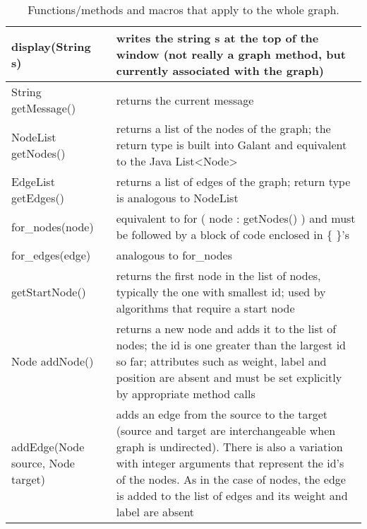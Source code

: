 \begin{table}
  \centering
  \begin{tabular}{| l | p{} |}
    \hline
    \textsf{display(String s)}
    &
    writes the string \textsf{s} at the top of the window
    (not really a graph method, but currently associated with the graph)
    \\ \hline
    \textsf{String getMessage()}
    &
    returns the current message
    \\ \hline
    \textsf{NodeList getNodes()}
    &
    returns a list of the nodes of the graph; the return type is built into Galant
    and equivalent to the Java \textsf{List<Node>}
    \\ \hline
    \textsf{EdgeList getEdges()}
    &
    returns a list of edges of the graph; return type is analogous to \textsf{NodeList}
    \\ \hline
    \textsf{for\_nodes(node)}
    &
    equivalent to \textsf{for ( node : getNodes() )} and must be followed by a block
    of code enclosed in \textsf{\{ \}}'s
    \\ \hline
    \textsf{for\_edges(edge)}
    &
    analogous to \textsf{for\_nodes}
    \\ \hline
    \textsf{getStartNode()}
    &
    returns the first node in the list of nodes, typically the one with smallest id;
    used by algorithms that require a start node
    \\ \hline
    \textsf{Node addNode()}
    &
    returns a new node and adds it to the list of nodes;
    the id is one greater than the largest id so far;
    attributes such as weight, label and position are absent and must be set explicitly
    by appropriate method calls
    \\ \hline
    \textsf{addEdge(Node source, Node target)}
    &
    adds an edge from the source to
    the target (source and target are interchangeable when graph is undirected).
    There is also a variation with integer arguments that represent the id's of the nodes. As in the case of nodes, the edge is added to the list of edges and
    its weight and label are absent
    \\ \hline
  \end{tabular}
  \caption{Functions/methods and macros that apply to the whole graph.}
  \label{tab:graph_functions}
\end{table}
